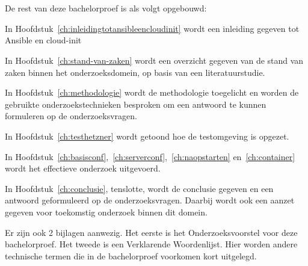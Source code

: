 

\section{}
\label{sec:opzet-bachelorproef}


De rest van deze bachelorproef is als volgt opgebouwd:

In Hoofdstuk~\ref{ch:inleidingtotansibleencloudinit} wordt een inleiding gegeven tot Ansible en cloud-init

In Hoofdstuk~\ref{ch:stand-van-zaken} wordt een overzicht gegeven van de stand van zaken binnen het onderzoeksdomein, op basis van een literatuurstudie.

In Hoofdstuk~\ref{ch:methodologie} wordt de methodologie toegelicht en worden de gebruikte onderzoekstechnieken besproken om een antwoord te kunnen formuleren op de onderzoeksvragen.

In Hoofdstuk~\ref{ch:testhetzner} wordt getoond hoe de testomgeving is opgezet.

In Hoofdstuk~\ref{ch:basisconf},~\ref{ch:serverconf},~\ref{ch:naopstarten} en~\ref{ch:container} wordt het effectieve onderzoek uitgevoerd.

In Hoofdstuk~\ref{ch:conclusie}, tenslotte, wordt de conclusie gegeven en een antwoord geformuleerd op de onderzoeksvragen. Daarbij wordt ook een aanzet gegeven voor toekomstig onderzoek binnen dit domein.

Er zijn ook 2 bijlagen aanwezig. Het eerste is het Onderzoeksvoorstel voor deze bachelorproef. Het tweede is een Verklarende Woordenlijst. Hier worden andere technische termen die in de bachelorproef voorkomen kort uitgelegd.